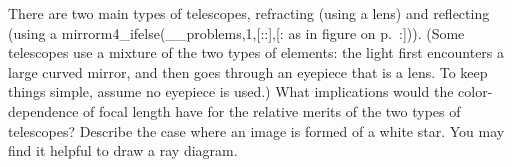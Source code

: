 There are two main types of telescopes, refracting (using
a lens) and reflecting (using a mirrorm4_ifelse(__problems,1,[::],[: as in figure 
on p.~\pageref{fig:newtonian-telescope-eye}:])). (Some telescopes
use a mixture of the two types of elements: the light first
encounters a large curved mirror, and then goes through an
eyepiece that is a lens. To keep things simple, assume no eyepiece is used.) What implications would the
color-dependence of focal length have for the relative
merits of the two types of telescopes? Describe the case
where an image is formed of a white star. You may find
it helpful to draw a ray diagram.
